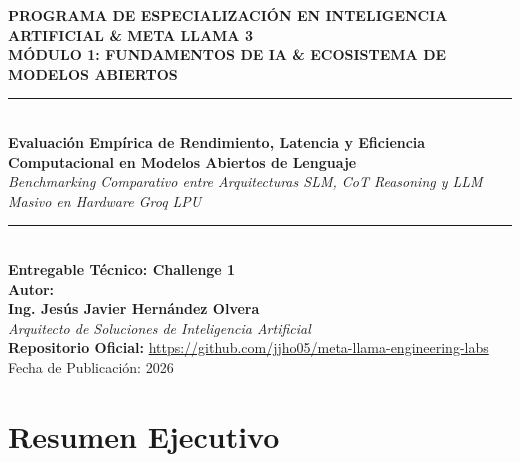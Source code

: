 \documentclass[12pt,letterpaper]{article}
\begin{document}
\begin{titlepage}
  \centering
  \vspace*{1.5cm}
  
  {\Large\textbf{PROGRAMA DE ESPECIALIZACIÓN EN INTELIGENCIA ARTIFICIAL \& META LLAMA 3}}\\[0.8cm]
  {\large\textbf{MÓDULO 1: FUNDAMENTOS DE IA \& ECOSISTEMA DE MODELOS ABIERTOS}}\\[1.5cm]
  
  \rule{\linewidth}{0.6mm}\\[0.5cm]
  {\LARGE\textbf{Evaluación Empírica de Rendimiento, Latencia y Eficiencia Computacional en Modelos Abiertos de Lenguaje}}\\[0.3cm]
  {\large\textit{Benchmarking Comparativo entre Arquitecturas SLM, CoT Reasoning y LLM Masivo en Hardware Groq LPU}}\\[0.2cm]
  \rule{\linewidth}{0.6mm}\\[2cm]
  
  \textbf{Entregable Técnico: Challenge 1}\\[0.8cm]
  
  \textbf{Autor:}\\
  {\Large\textbf{Ing. Jesús Javier Hernández Olvera}}\\
  \textit{Arquitecto de Soluciones de Inteligencia Artificial}\\[2.5cm]
  
  \vfill
  {\large\textbf{Repositorio Oficial:}} \url{https://github.com/jjho05/meta-llama-engineering-labs}\\[0.3cm]
  {\small Fecha de Publicación: 2026}
\end{titlepage}

\newpage
{}

\section*{Resumen Ejecutivo}
\end{document}
